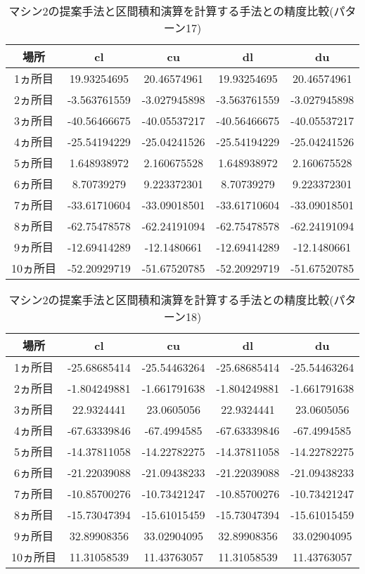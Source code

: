 \documentclass[11pt,a4paper]{jsreport}
\theoremstyle{definition}
\begin{document}
\begin{table}[H]
\centering
\begin{tabular}{|c|c|c|c|c|}
\hline
場所 & cl & cu & dl & du \\ \hline
1ヵ所目 & 19.93254695 & 20.46574961 & 19.93254695 & 20.46574961 \\ \hline
2ヵ所目 & -3.563761559 & -3.027945898 & -3.563761559 & -3.027945898 \\ \hline
3ヵ所目 & -40.56466675 & -40.05537217 & -40.56466675 & -40.05537217 \\ \hline
4ヵ所目 & -25.54194229 & -25.04241526 & -25.54194229 & -25.04241526 \\ \hline
5ヵ所目 & 1.648938972 & 2.160675528 & 1.648938972 & 2.160675528 \\ \hline
6ヵ所目 & 8.70739279 & 9.223372301 & 8.70739279 & 9.223372301 \\ \hline
7ヵ所目 & -33.61710604 & -33.09018501 & -33.61710604 & -33.09018501 \\ \hline
8ヵ所目 & -62.75478578 & -62.24191094 & -62.75478578 & -62.24191094 \\ \hline
9ヵ所目 & -12.69414289 & -12.1480661 & -12.69414289 & -12.1480661 \\ \hline
10ヵ所目 & -52.20929719 & -51.67520785 & -52.20929719 & -51.67520785 \\ \hline
\end{tabular}
\caption{マシン2の提案手法と区間積和演算を計算する手法との精度比較(パターン17)}
\end{table}

\begin{table}[H]
\centering
\begin{tabular}{|c|c|c|c|c|}
\hline
場所 & cl & cu & dl & du \\ \hline
1ヵ所目 & -25.68685414 & -25.54463264 & -25.68685414 & -25.54463264 \\ \hline
2ヵ所目 & -1.804249881 & -1.661791638 & -1.804249881 & -1.661791638 \\ \hline
3ヵ所目 & 22.9324441 & 23.0605056 & 22.9324441 & 23.0605056 \\ \hline
4ヵ所目 & -67.63339846 & -67.4994585 & -67.63339846 & -67.4994585 \\ \hline
5ヵ所目 & -14.37811058 & -14.22782275 & -14.37811058 & -14.22782275 \\ \hline
6ヵ所目 & -21.22039088 & -21.09438233 & -21.22039088 & -21.09438233 \\ \hline
7ヵ所目 & -10.85700276 & -10.73421247 & -10.85700276 & -10.73421247 \\ \hline
8ヵ所目 & -15.73047394 & -15.61015459 & -15.73047394 & -15.61015459 \\ \hline
9ヵ所目 & 32.89908356 & 33.02904095 & 32.89908356 & 33.02904095 \\ \hline
10ヵ所目 & 11.31058539 & 11.43763057 & 11.31058539 & 11.43763057 \\ \hline
\end{tabular}
\caption{マシン2の提案手法と区間積和演算を計算する手法との精度比較(パターン18)}
\end{table}
\end{document}
